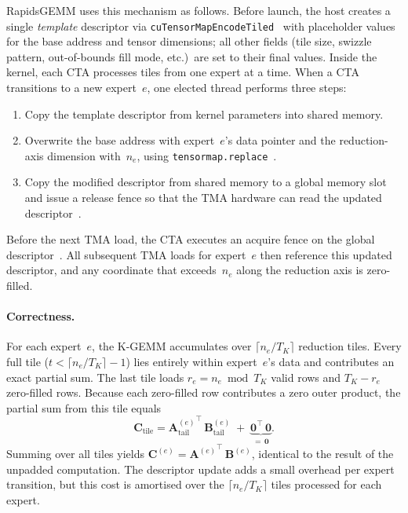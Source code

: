 \documentclass[11pt,a4paper]{article}
\theoremstyle{definition}
\begin{document}
RapidsGEMM uses this mechanism as follows.
Before launch, the host creates a single \emph{template} descriptor via
\texttt{cuTensorMapEncodeTiled}~\cite{nvidia_cuda_toolkit} with
placeholder values for the base address and tensor dimensions; all
other fields (tile size, swizzle pattern, out-of-bounds fill mode,
etc.)\ are set to their final values.
Inside the kernel, each CTA processes tiles from one expert at a time.
When a CTA transitions to a new expert~$e$, one elected thread
performs three steps:
\begin{enumerate}
  \item Copy the template descriptor from kernel parameters into
    shared memory.
  \item Overwrite the base address with expert~$e$'s data pointer and
    the reduction-axis dimension with~$n_e$, using
    \texttt{tensormap.replace}~\cite{nvidia_ptx_isa}.
  \item Copy the modified descriptor from shared memory to a global
    memory slot and issue a release fence so that the TMA hardware can
    read the updated
    descriptor~\cite{nvidia_cuda_programming_guide}.
\end{enumerate}
Before the next TMA load, the CTA executes an acquire fence on the
global descriptor~\cite{nvidia_cuda_programming_guide}.
All subsequent TMA loads for expert~$e$ then reference this updated
descriptor, and any coordinate that exceeds~$n_e$ along the reduction
axis is zero-filled.

\paragraph{Correctness.}
For each expert~$e$, the K-GEMM accumulates over
$\lceil n_e / T_K \rceil$ reduction tiles.
Every full tile ($t < \lceil n_e / T_K \rceil - 1$) lies entirely
within expert~$e$'s data and contributes an exact partial sum.
The last tile loads $r_e = n_e \bmod T_K$ valid rows and
$T_K - r_e$ zero-filled rows.
Because each zero-filled row contributes a zero outer product, the
partial sum from this tile equals
\begin{equation}
  \mathbf{C}_{\text{tile}} =
    {\mathbf{A}^{(e)}_{\text{tail}}}^{\!\top}
    \,\mathbf{B}^{(e)}_{\text{tail}}
    \;+\;
    \underbrace{\mathbf{0}^{\!\top}\,\mathbf{0}}_{=\,\mathbf{0}}.
\label{eq:kgemm-zerofill}
\end{equation}
Summing over all tiles yields
$\mathbf{C}^{(e)} = {\mathbf{A}^{(e)}}^{\!\top}\,\mathbf{B}^{(e)}$,
identical to the result of the unpadded computation.
The descriptor update adds a small overhead per expert transition, but
this cost is amortised over the $\lceil n_e / T_K \rceil$ tiles
processed for each expert.
\end{document}
